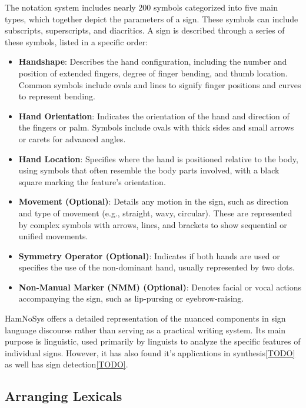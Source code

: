 \documentclass[../../main.tex]{subfiles}
\begin{document}
The notation system includes nearly 200 symbols categorized into five main types, which together depict the parameters of a sign. These symbols can include subscripts, superscripts, and diacritics. A sign is described through a series of these symbols, listed in a specific order:

\begin{itemize}
    \item \textbf{Handshape}: Describes the hand configuration, including the number and position of extended fingers, degree of finger bending, and thumb location. Common symbols include ovals and lines to signify finger positions and curves to represent bending.
    \item \textbf{Hand Orientation}: Indicates the orientation of the hand and direction of the fingers or palm. Symbols include ovals with thick sides and small arrows or carets for advanced angles.
    \item \textbf{Hand Location}: Specifies where the hand is positioned relative to the body, using symbols that often resemble the body parts involved, with a black square marking the feature's orientation.
    \item \textbf{Movement (Optional)}: Details any motion in the sign, such as direction and type of movement (e.g., straight, wavy, circular). These are represented by complex symbols with arrows, lines, and brackets to show sequential or unified movements.
    \item \textbf{Symmetry Operator (Optional)}: Indicates if both hands are used or specifies the use of the non-dominant hand, usually represented by two dots.
    \item \textbf{Non-Manual Marker (NMM) (Optional)}: Denotes facial or vocal actions accompanying the sign, such as lip-pursing or eyebrow-raising.
\end{itemize}

HamNoSys offers a detailed representation of the nuanced components in sign language discourse rather than serving as a practical writing system. Its main purpose is linguistic, used primarily by linguists to analyze the specific features of individual signs. However, it has also found it's applications in synthesis\ref{TODO} as well has sign detection\ref{TODO}.


\subsection{Arranging Lexicals}
\end{document}
